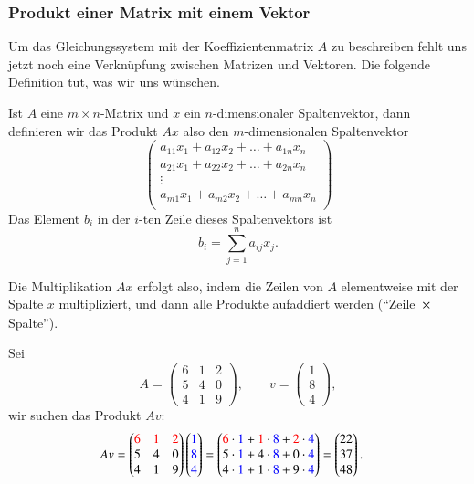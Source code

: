 \subsubsection{Produkt einer Matrix mit einem Vektor}
Um das Gleichungssystem mit der Koeffizientenmatrix $A$ zu beschreiben
fehlt uns jetzt noch eine Verknüpfung zwischen Matrizen und
Vektoren.
Die folgende Definition tut, was wir uns wünschen.
\begin{definition}
Ist $A$ eine $m\times n$-Matrix und $x$ ein $n$-dimensionaler Spaltenvektor,
dann definieren wir das Produkt $Ax$ also den $m$-dimensionalen
Spaltenvektor
\[
\begin{pmatrix}
a_{11}x_1+a_{12}x_2+\dots+a_{1n}x_n\\
a_{21}x_1+a_{22}x_2+\dots+a_{2n}x_n\\
\vdots\\
a_{m1}x_1+a_{m2}x_2+\dots+a_{mn}x_n\\
\end{pmatrix}
\]
Das Element $b_i$ in der $i$-ten Zeile dieses Spaltenvektors ist
\[
b_i=\sum_{j=1}^na_{ij}x_j.
\]
\end{definition}
Die Multiplikation $Ax$ erfolgt also, indem die Zeilen von $A$
elementweise mit der Spalte $x$ multipliziert, und dann alle Produkte
aufaddiert werden (``Zeile $\strut \times\mathstrut$ Spalte'').

\begin{beispiel} Sei
\[
A=\begin{pmatrix}
6&1&2\\
5&4&0\\
4&1&9
\end{pmatrix}
,\qquad
v=
\begin{pmatrix}
1\\8\\4
\end{pmatrix},
\]
wir suchen das Produkt $Av$:
\begin{align*}
Av&=
\begin{pmatrix}
\color{red}6&\color{red}1&\color{red}2\\
5&4&0\\
4&1&9
\end{pmatrix}
\begin{pmatrix}
\color{blue}1\\\color{blue}8\\\color{blue}4
\end{pmatrix}
=
\begin{pmatrix}
{\color{red}6}\cdot{\color{blue}1}+
{\color{red}1}\cdot{\color{blue}8}+
{\color{red}2}\cdot{\color{blue}4}
\\
5\cdot{\color{blue}1}+
4\cdot{\color{blue}8}+
0\cdot{\color{blue}4}
\\
4\cdot{\color{blue}1}+
1\cdot{\color{blue}8}+
9\cdot{\color{blue}4}
\end{pmatrix}
=\begin{pmatrix}
22\\37\\48
\end{pmatrix}.
\end{align*}
\end{beispiel}

